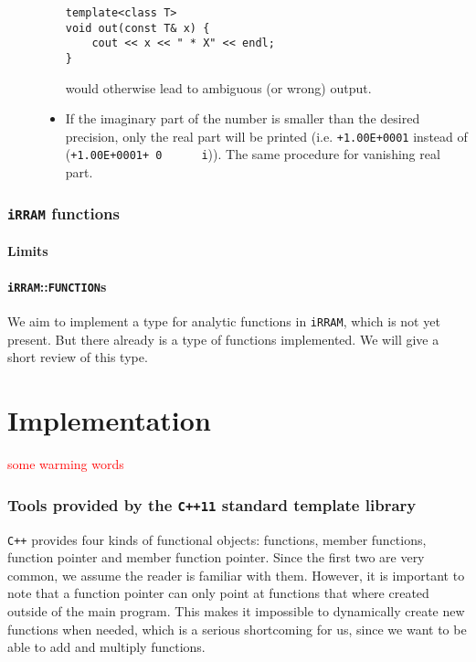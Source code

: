 \documentclass{article}
\newcommand{\irram}{\texttt{iRRAM}\xspace}
\newcommand{\cc}{\texttt{C++}\xspace}
\newcommand{\ccOx}{\texttt{C++11}\xspace}
\newcommand{\ir}[1]{\texttt{#1}}
\newcommand{\code}[1]{\texttt{#1}}
\newcommand{\temp}[1]{\textcolor{red}{#1}}
\begin{document}
\begin{description}
\begin{itemize}
\begin{lstlisting}
template<class T>
void out(const T& x) {
	cout << x << " * X" << endl;
}
\end{lstlisting}
would otherwise lead to ambiguous (or wrong) output.
\item If the imaginary part of the number is smaller than the desired precision, only the real part will be printed (i.e. \code{+1.00E+0001} instead of (\code{+1.00E+0001+ 0 \ \ \ \ \  i})). The same procedure for vanishing real part.
\end{itemize}
\end{description}

\section{\irram functions}

\subsection{Limits}

\subsection{\irram::\ir{FUNCTION}s}

We aim to implement a type for analytic functions in \irram, which is not yet present. But there already is a type of functions implemented. We will give a short review of this type.

\part{Implementation}

\temp{some warming words}

\section{Tools provided by the \ccOx standard template library}

\cc provides four kinds of functional objects: functions, member functions, function pointer and member function pointer. Since the first two are very common, we assume the reader is familiar with them. However, it is important to note that a function pointer can only point at functions that where created outside of the main program. This makes it impossible to dynamically create new functions when needed, which is a serious shortcoming for us, since we want to be able to add and multiply functions.
\end{document}
